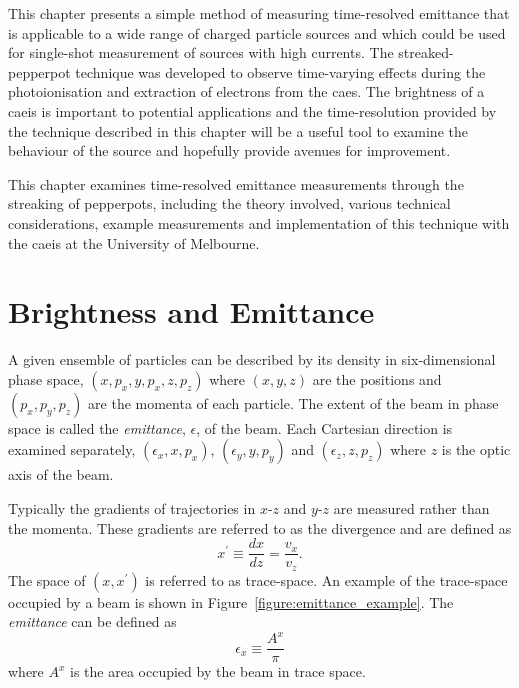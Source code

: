 This chapter presents a simple method of measuring time-resolved emittance that is applicable to a wide range of charged particle sources and which could be used for single-shot measurement of sources with high currents.
The streaked-pepperpot technique was developed to observe time-varying effects during the photoionisation and extraction of electrons from the \gls{caes}.
The brightness of a \gls{caeis} is important to potential applications and the time-resolution provided by the technique described in this chapter will be a useful tool to examine the behaviour of the source and hopefully provide avenues for improvement.

This chapter examines time-resolved emittance measurements through the streaking of pepperpots, including the theory involved, various technical considerations, example measurements and implementation of this technique with the \gls{caeis} at the University of Melbourne.

\section{Brightness and Emittance}

A given ensemble of particles can be described by its density in six-dimensional phase space, $(x, p_x, y, p_x, z, p_z)$ where $(x, y, z)$ are the positions and $(p_x, p_y, p_z)$ are the momenta of each particle.
The extent of the beam in phase space is called the \emph{emittance}, $\epsilon$, of the beam.
Each Cartesian direction is examined separately, $(\epsilon_x, x, p_x)$, $(\epsilon_y, y, p_y)$ and $(\epsilon_z, z, p_z)$ where $z$ is the optic axis of the beam.

Typically the gradients of trajectories in $x$-$z$ and $y$-$z$ are measured rather than the momenta.
These gradients are referred to as the divergence and are defined as
\begin{equation}\label{equation:divergence}
x^\prime \equiv \frac{dx}{dz} = \frac{v_x}{v_z}.
\end{equation}
The space of $(x, x^\prime)$ is referred to as trace-space.
An example of the trace-space occupied by a beam is shown in Figure~\ref{figure:emittance_example}.
The \emph{emittance} can be defined as
\begin{equation}
\epsilon_x \equiv \frac{A^x}{\pi}
\end{equation}
where $A^x$ is the area occupied by the beam in trace space.

